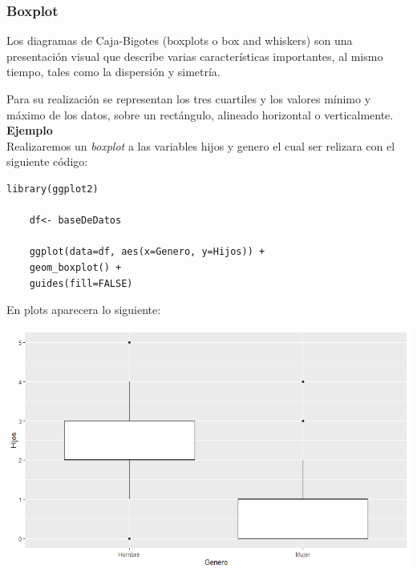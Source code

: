 \documentclass[12pt,hidelinks]{article}
\begin{document}
	\subsubsection{Boxplot}
	Los diagramas de Caja-Bigotes (boxplots o box and whiskers) son una presentación visual que describe varias características importantes, al mismo tiempo, tales como la dispersión y simetría.
	
	Para su realización se representan los tres cuartiles y los valores mínimo y máximo de los datos, sobre un rectángulo, alineado horizontal o verticalmente.\\
	\textbf{Ejemplo}\\
	Realizaremos un  \textit{boxplot} a las variables hijos y genero el cual ser relizara con el siguiente código:
	\begin{lstlisting}[frame=single]
	library(ggplot2)
	
	df<- baseDeDatos
	
	ggplot(data=df, aes(x=Genero, y=Hijos)) + 
	geom_boxplot() +
	guides(fill=FALSE)
	\end{lstlisting}
	En plots aparecera lo siguiente:
	\begin{center}
		\includegraphics[width = 14cm]{GaficaBox.png}
	\end{center}
	
\end{document}
